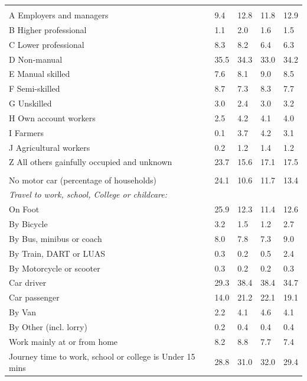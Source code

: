 \documentclass{article}
\begin{document}
\begin{table}[h]
\begin{tabular}{KTTTT}
\hline
    \\ 
    \hline
A Employers and managers &  9.4& 12.8& 11.8& 12.9\\
B Higher professional & 1.1& 2.0& 1.6& 1.5\\
C Lower professional & 8.3& 8.2& 6.4& 6.3\\
D Non-manual & 35.5& 34.3& 33.0& 34.2\\
E Manual skilled & 7.6& 8.1& 9.0& 8.5\\
F Semi-skilled & 8.7& 7.3& 8.3& 7.7\\
G Unskilled & 3.0& 2.4& 3.0& 3.2\\
H Own account workers & 2.5& 4.2& 4.1& 4.0\\
I Farmers & 0.1& 3.7& 4.2& 3.1\\
J Agricultural workers & 0.2& 1.2& 1.4& 1.2\\
Z All others gainfully occupied and unknown & 23.7& 15.6& 17.1& 17.5\\
\hline
{}\hline
    \\ 
    \hline
No motor car (percentage of households) & 24.1& 10.6& 11.7& 
13.4\\
    \hline 
\emph{Travel to work, school, College or childcare:} & & & \\
\quad On Foot & 25.9& 12.3& 11.4& 12.6\\ 
\quad By Bicycle & 3.2& 1.5& 1.2& 2.7\\ 
\quad By Bus, minibus or coach & 8.0& 7.8& 7.3& 9.0\\
\quad By Train, DART or LUAS & 0.3& 0.2& 0.5& 2.4\\
\quad By Motorcycle or scooter & 0.3& 0.2& 0.2& 0.3\\
\quad Car driver & 29.3 & 38.4& 38.4& 34.7\\
\quad Car passenger & 14.0& 21.2& 22.1& 19.1\\
\quad By Van & 2.2& 4.1& 4.6& 4.1\\
\quad By Other (incl. lorry) & 0.2& 0.4& 0.4& 0.4\\
    \hline
Work mainly at or from home & 8.2& 8.8& 7.7& 7.4\\
Journey time to work, school or college is Under 15 mins & 28.8& 31.0& 32.0& 29.4\\

\end{tabular}
\end{table}
\end{document}
